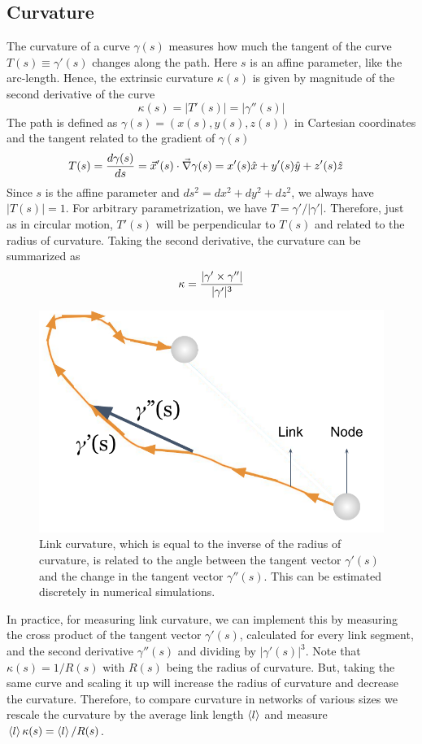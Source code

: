 \documentclass[nofootinbib,preprint,floatfix,titlepage,superscriptaddress]{revtex4} %
\begin{document}
\subsection{Curvature\label{ap:curvature}}
The curvature of a curve $\gamma(s)$ measures how much the tangent of the curve $T(s) \equiv \gamma'(s)$ changes along the path. 
Here $s$ is an affine parameter, like the arc-length.  
Hence, the extrinsic curvature $\kappa(s)$ is given by magnitude of the second derivative of the curve 
\begin{equation}
    \kappa(s) = |T'(s)| = |\gamma''(s)|
\end{equation}
The path is defined as $\gamma(s) = (x(s),y(s),z(s))$ in Cartesian coordinates and the tangent related to the gradient of $\gamma(s)$
\begin{align}
    T(s) &= {d \gamma(s) \over ds} = \vec{x}'(s)\cdot \vec{\nabla} \gamma(s) = x'(s)\hat{x}+y'(s)\hat{y}+z'(s)\hat{z} 
\end{align}
Since $s$ is the affine parameter and $ds^2 = dx^2 + dy^2 + dz^2$, we always have $|T(s)|=1$. 
For arbitrary parametrization, we have $T = \gamma'/|\gamma'|$.
Therefore, just as in circular motion, $T'(s)$ will be perpendicular to $T(s)$ and related to the radius of curvature. 
Taking the second derivative, the curvature can be summarized as 
\begin{equation}
    \kappa = {|\gamma'\times \gamma''|\over |\gamma'|^{3}}
\end{equation}
\begin{figure}
    \centering
    \includegraphics[width = .5\columnwidth]{fig-09-19/curvature.pdf}
    \caption{Link curvature, which is equal to the inverse of the radius of curvature, is related to the angle between the tangent vector $\gamma'(s)$ and the change in the tangent vector $\gamma''(s)$. This can be estimated discretely in numerical simulations.}
    \label{fig:curvature}
\end{figure}
In practice, for measuring link curvature, we can implement this by measuring the cross product of the tangent vector $\gamma'(s)$, calculated for every link segment, and the second derivative $\gamma''(s)$ and dividing by $|\gamma'(s)|^3$. 
Note that $\kappa(s) = 1/R(s)$ with $R(s)$ being the radius of curvature. 
But, taking the same curve and scaling it up will increase the radius of curvature and decrease the curvature. 
Therefore, to compare curvature in networks of various sizes we rescale the curvature by the average link length $\left<l\right>$ and measure $\left<l\right>\kappa(s) = \left<l\right>/R(s)$.
\end{document}
